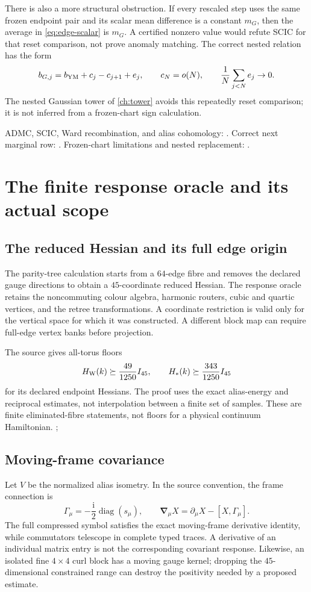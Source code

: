 \documentclass[11pt,oneside,openany]{book}
\theoremstyle{definition}
\theoremstyle{remark}
\newcommand{\ii}{\mathrm i}
\newcommand{\diag}{\operatorname{diag}}
\newcommand{\src}[2]{\cite[#2]{#1}}
\newcommand{\sourcebasis}[1]{\par\smallskip\noindent #1\par}
\begin{document}
There is also a more structural obstruction. If every rescaled step uses the same frozen endpoint pair and its scalar mean difference is a constant $m_G$, then the average in \cref{eq:edge-scalar} is $m_G$. A certified nonzero value would refute SCIC for that reset comparison, not prove anomaly matching. The correct nested relation has the form
\begin{equation}\label{eq:nested-shell-cob}
b_{G,j}=b_{\rm YM}+c_j-c_{j+1}+e_j,
\qquad c_N=o(N),\qquad \frac1N\sum_{j<N}e_j\to0.
\end{equation}
The nested Gaussian tower of \cref{ch:tower} avoids this repeatedly reset comparison; it is not inferred from a frozen-chart sign calculation. \src{F11}{V31--V32}
\sourcebasis{ADMC, SCIC, Ward recombination, and alias cohomology: \src{F9}{V13--V17}. Correct next marginal row: \src{F10}{V100}. Frozen-chart limitations and nested replacement: \src{F11}{V31--V34}.}

\chapter{The finite response oracle and its actual scope}
\label{ch:oracle}
\section{The reduced Hessian and its full edge origin}
The parity-tree calculation starts from a $64$-edge fibre and removes the declared gauge directions to obtain a $45$-coordinate reduced Hessian. The response oracle retains the noncommuting colour algebra, harmonic routers, cubic and quartic vertices, and the retree transformations. A coordinate restriction is valid only for the vertical space for which it was constructed. A different block map can require full-edge vertex banks before projection.

The source gives all-torus floors
\begin{equation}\label{eq:finite-H-floor}
H_{\rm W}(k)\succeq\frac{49}{1250}I_{45},\qquad
H_*(k)\succeq\frac{343}{1250}I_{45}
\end{equation}
for its declared endpoint Hessians. The proof uses the exact alias-energy and reciprocal estimates, not interpolation between a finite set of samples. These are finite eliminated-fibre statements, not floors for a physical continuum Hamiltonian. \src{F9}{V63 and endpoint development}; \src{F10}{inherited oracle}

\section{Moving-frame covariance}
Let $V$ be the normalized alias isometry. In the source convention, the frame connection is
\[
\Gamma_\mu=-\frac{\ii}{2}\diag(s_\mu),\qquad
\boldsymbol\nabla_\mu X=\partial_\mu X-[X,\Gamma_\mu].
\]
The full compressed symbol satisfies the exact moving-frame derivative identity, while commutators telescope in complete typed traces. A derivative of an individual matrix entry is not the corresponding covariant response. Likewise, an isolated fine $4\times4$ curl block has a moving gauge kernel; dropping the $45$-dimensional constrained range can destroy the positivity needed by a proposed estimate.
\end{document}
